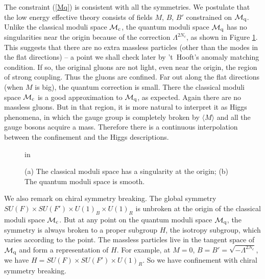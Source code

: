 \documentclass[lecture]{qft-l}
\newcommand{\Lam}{\varLambda}
\newcommand{\bef}{\begin{figure}[h]
		\vspace{3ex}}
\newcommand{\enf}{\end{figure}}
\newcommand{\bra}{\langle}
\newcommand{\ket}{\rangle}
\newcommand{\MM}{{\mathcal M}}
\newcommand{\MC}{\MM_{{\rm c}}}
\newcommand{\MQ}{\MM_{{\rm q}}}
\newcommand{\FT}{F'}%
\newcommand{\BT}{B'}%
\newcommand{\GLOBAL}{SU(F)\times SU(\FT)\times U(1)_B\times U(1)_R}
\numberwithin{figure}{chapter}
\begin{document}
The constraint (\ref{Mq}) is consistent with all the symmetries.
We postulate that the low energy effective theory consists of fields
$M$, $B$, $\BT$ constrained on $\MQ$.
Unlike the classical moduli space $\MC$, the quantum moduli space $\MQ$ has 
no singularities near the origin because of the correction $\Lam^{2N_c}$,
as shown in Figure \ref{SMOOTH}.
This suggests that there are no extra massless particles (other than the
modes in the flat directions) -- a point we shall check later by 't~Hooft's
anomaly matching condition.
If so, the original gluons are not light, even near the origin,
the region of strong coupling.
Thus the gluons are confined.
Far out along the flat directions (when $M$ is big), the quantum
correction is small.
There the classical moduli space $\MC$ is a good approximation to $\MQ$,
as expected.
Again there are no massless gluons.
But in that region, it is more natural to interpret it as Higgs phenomena,
in which the gauge group is completely broken by $\bra M\ket$ and
all the gauge bosons acquire a mass.
Therefore there is a continuous interpolation between the confinement and 
the Higgs descriptions.

	\bef
{} in
\centerline{}
\caption{\protect\label{SMOOTH}(a) The classical moduli space has a 
singularity at the origin; (b) The quantum moduli space is smooth.}
	\enf

We also remark on chiral symmetry breaking.
The global symmetry $\GLOBAL$ is unbroken at the origin of the classical
moduli space $\MC$.
But at any point on the quantum moduli space $\MQ$, the symmetry is always 
broken to a proper subgroup $H$, the isotropy subgroup, which varies
according to the point.
The massless particles live in the tangent space of $\MQ$
and form a representation of $H$.
For example, at $M=0$, $B=\BT=\sqrt{-\Lam^{2N_c}}$, we have
$H=SU(F)\times SU(\FT)\times U(1)_R$.
So we have confinement with chiral symmetry breaking.
\end{document}
